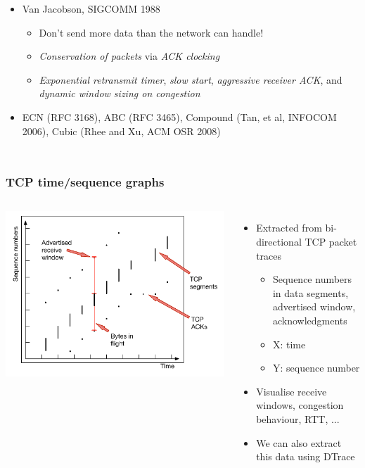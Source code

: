 \begin{frame}
\begin{columns}[T]
\begin{itemize}
	\item Van Jacobson, SIGCOMM 1988
	\begin{itemize}
	  \item Don't send more data than the network can handle!
	  \item \textit{Conservation of packets} via \textit{ACK clocking}
	  \item \textit{Exponential retransmit timer}, \textit{slow start},
	    \textit{aggressive receiver ACK}, and \textit{dynamic window
	    sizing on congestion}
        \end{itemize}

	\pause

        \item ECN (RFC 3168), ABC (RFC 3465), Compound (Tan, et al, INFOCOM
	  2006), Cubic (Rhee and Xu, ACM OSR 2008)
      \end{itemize}
  \end{columns}
\end{frame}

\begin{frame}
  \frametitle{TCP time/sequence graphs}

  \begin{columns}[T]
      \bigskip
      \includegraphics[width=1.25\textwidth]{../../figures/tcp-time-sequence.pdf}

    \begin{itemize}
      \item Extracted from bi-directional TCP packet traces
      \begin{itemize}
	\item Sequence numbers in data segments, advertised window,
	  acknowledgments
	\item X: time
	\item Y: sequence number
      \end{itemize}
      \item Visualise receive windows, congestion behaviour, RTT, ...
      \item We can also extract this data using DTrace
    \end{itemize}
  \end{columns}
\end{frame}

